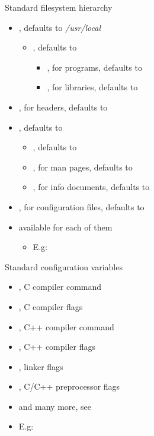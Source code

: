 \begin{frame}{Standard filesystem hierarchy}
  \begin{itemize}
  \item {}, defaults to {\em /usr/local}
    \begin{itemize}
    \item {}, defaults to 
      \begin{itemize}
      \item {}, for programs, defaults to 
      \item {}, for libraries, defaults to 
      \end{itemize}
    \end{itemize}
  \item {}, for headers, defaults to 
  \item {}, defaults to 
    \begin{itemize}
    \item {}, defaults to 
    \item {}, for man pages, defaults to 
    \item {}, for info documents, defaults to 
    \end{itemize}
  \item {}, for configuration files, defaults to
  \item {} available for each of them
    \begin{itemize}
    \item E.g: 
    \end{itemize}
  \end{itemize}
\end{frame}

\begin{frame}{Standard configuration variables}
  \begin{itemize}
  \item {}, C compiler command
  \item {}, C compiler flags
  \item {}, C++ compiler command
  \item {}, C++ compiler flags
  \item {}, linker flags
  \item {}, C/C++ preprocessor flags
  \item and many more, see 
  \item E.g: 
  \end{itemize}
\end{frame}

